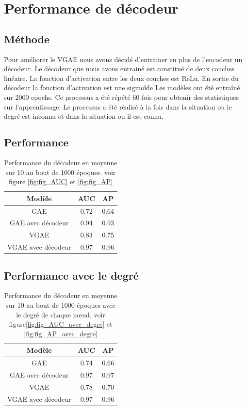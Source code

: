 \documentclass{article}
\begin{document}
\section{Performance de décodeur}
\subsection{Méthode}
Pour améliorer le VGAE nous avons décidé d'entrainer en plus de l'encodeur un décodeur. 
Le décodeur que nous avons entrainé est constitué de deux couches linéaire.
La fonction d'activation entre les deux couches est ReLu.
En sortie du décodeur la fonction d'activation est une sigmoîde
Les modèles ont été entraîné sur 2000 epochs. 
Ce processus a été répété 60 fois pour obtenir des statistiques sur l'apprentissage.
Le processus a été réalisé à la fois dans la situation ou le degré est inconnu et dans la situation ou il est connu.

\subsection{Performance}


\begin{table}[H]
    \centering
    \begin{tabular}{|c|c|c|}
        \hline
        Modèle & AUC & AP\\
        \hline
        GAE & 0.72 & 0.64\\
        \hline
        GAE avec décodeur & 0.94 & 0.93\\
        \hline
        VGAE & 0.83 & 0.75\\
        \hline
        VGAE avec décodeur & 0.97 & 0.96\\
        \hline
    \end{tabular}
    \caption{Performance du décodeur en moyenne sur 10 au bout de 1000 époques. voir figure \ref{fig:fig_AUC} et \ref{fig:fig_AP}}
    \label{tab:performance_decodeur}
\end{table}

\subsection{Performance avec le degré}

\begin{table}[H]
    \centering
    \begin{tabular}{|c|c|c|}
        \hline
        Modèle & AUC & AP\\
        \hline
        GAE & 0.74 & 0.66\\
        \hline
        GAE avec décodeur & 0.97 & 0.97\\
        \hline
        VGAE & 0.78 & 0.70\\
        \hline
        VGAE avec décodeur & 0.97 & 0.96\\
        \hline
    \end{tabular}
    \caption{Performance du décodeur en moyenne sur 10 au bout de 1000 époques avec le degré de chaque nœud. voir figure\ref{fig:fig_AUC_avec_degre} et \ref{fig:fig_AP_avec_degre}}
    \label{tab:performance_decodeur_avec_degre}
\end{table}
\end{document}
